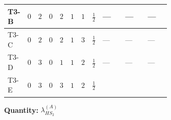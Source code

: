 \documentclass[8pt]{article}
\begin{document}
\begin{landscape}
\begin{longtable}{@{}llcccccc >{\raggedright\arraybackslash}p{0.21\linewidth} >{\raggedright\arraybackslash}p{0.21\linewidth} >{\raggedright\arraybackslash}p{0.21\linewidth}@{}}
\midrule
T3-B & $0$ & $2$ & $0$ & $2$ & $1$ & $1$ & $\frac{1}{2}$ & --- & --- & --- \\
\midrule
T3-C & $0$ & $2$ & $0$ & $2$ & $1$ & $3$ & $\frac{1}{2}$ & --- & --- & --- \\
\midrule
T3-D & $0$ & $3$ & $0$ & $1$ & $1$ & $2$ & $\frac{1}{2}$ & --- & --- & --- \\
\midrule
T3-E & $0$ & $3$ & $0$ & $3$ & $1$ & $2$ & $\frac{1}{2}$ & \scriptsize\adjustbox{max width=\linewidth}{$\begin{gathered} {\lambda_{HS_2}^{(A)}} (2 T_{\nu}^{(2)}+6 \operatorname{Tr}\!\left({Y_d}\,\left({Y_d}\right)^{\dagger}\right)+2 \operatorname{Tr}\!\left({Y_e}\,\left({Y_e}\right)^{\dagger}\right)+6 \operatorname{Tr}\!\left({Y_u}\,\left({Y_u}\right)^{\dagger}\right)+16 {\lambda_{S_2}^{(A)}})\end{gathered}$} & \scriptsize\adjustbox{max width=\linewidth}{$\begin{gathered} +\frac{4}{3} \operatorname{Tr}\!\left({y_2}\,\left({y_2}\right)^{\dagger}\,{Y_e}\,\left({Y_e}\right)^{\dagger}\right)\end{gathered}$} & \scriptsize\adjustbox{max width=\linewidth}{$\begin{gathered} -\frac{8}{9} {\lambda_5} \left({\lambda_5}\right)^{*}\end{gathered}$} \\
\midrule
\bottomrule
\end{longtable}
\clearpage
\noindent\textbf{Quantity: }$\lambda_{HS_2}^{(A)}$\par\smallskip

\end{landscape}
\end{document}
